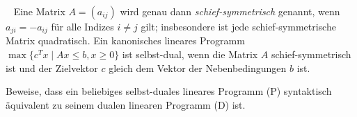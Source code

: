 \documentclass{uebung_cs}
\begin{document}
\begin{aufgabe}\
	Eine Matrix $A = (a_{ij})$ wird genau dann \emph{schief-symmetrisch} genannt, wenn $a_{ji} = -a_{ij}$ für alle Indizes $i \neq j$ gilt; insbesondere ist jede schief-symmetrische Matrix quadratisch. Ein kanonisches lineares Programm $\max\{c^T x  \; | \; Ax \leq b, x \geq 0\}$ ist selbst-dual, wenn die Matrix $A$ schief-symmetrisch ist und der Zielvektor $c$ gleich dem Vektor der Nebenbedingungen $b$ ist.
	
	Beweise, dass ein beliebiges selbst-duales lineares Programm (P) syntaktisch äquivalent zu seinem dualen linearen Programm (D) ist.
\end{aufgabe}
\end{document}
